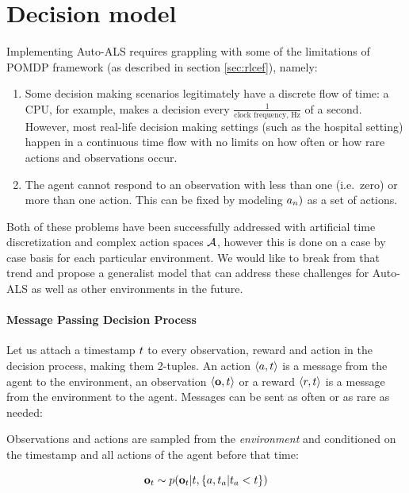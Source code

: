 \newpage
\section{Decision model}
\label{sec:mpdp}

Implementing Auto-ALS requires grappling with some of the limitations of POMDP framework (as described in section \ref{sec:rlcef}), namely:
\begin{enumerate}
    \item Some decision making scenarios legitimately have a discrete flow of time: a CPU, for example, makes a decision every $\frac{1}{\text{clock frequency, Hz}}$ of a second. However, most real-life decision making settings (such as the hospital setting) happen in a continuous time flow with no limits on how often or how rare actions and observations occur.
    \item The agent cannot respond to an observation with less than one (i.e.~zero) or more than one action. This can be fixed by modeling $a_n)$ as a set of actions.
\end{enumerate}

Both of these problems have been successfully addressed with artificial time discretization and complex action spaces $\mathcal{A}$, however this is done on a case by case basis for each particular environment.
We would like to break from that trend and propose a generalist model that can address these challenges for Auto-ALS as well as other environments in the future.

\paragraph{Message Passing Decision Process}

Let us attach a timestamp $t$ to every observation, reward and action in the decision process, making them 2-tuples. An action $\langle a, t\rangle$ is a message from the agent to the environment, an observation $\langle \mathbf{o}, t \rangle$ or a reward $\langle r, t \rangle$ is a message from the environment
to the agent. Messages can be sent as often or as rare as needed:

Observations and actions are sampled from the \emph{environment} and conditioned on the timestamp and all actions of the agent before that time:

\begin{equation}
    \mathbf{o}_t \sim p(\mathbf{o}_t|t,\{a, t_a | t_a < t\})
\end{equation}

